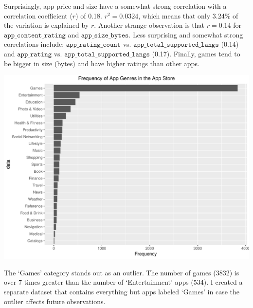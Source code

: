 \documentclass[]{article}
\newenvironment{Shaded}{\begin{snugshade}}{\end{snugshade}}
\newcommand{\KeywordTok}[1]{\textcolor[rgb]{0.13,0.29,0.53}{\textbf{#1}}}
\newcommand{\DataTypeTok}[1]{\textcolor[rgb]{0.13,0.29,0.53}{#1}}
\newcommand{\StringTok}[1]{\textcolor[rgb]{0.31,0.60,0.02}{#1}}
\newcommand{\OperatorTok}[1]{\textcolor[rgb]{0.81,0.36,0.00}{\textbf{#1}}}
\newcommand{\NormalTok}[1]{#1}
\begin{document}
Surprisingly, app price and size have a somewhat strong correlation with
a correlation coefficient (\(r\)) of 0.18. \(r^2=0.0324\), which means
that only 3.24\% of the variation is explained by \(r\). Another strange
observation is that \(r=0.14\) for \(\texttt{app\_content\_rating}\) and
\(\texttt{app\_size\_bytes}\). Less surprising and somewhat strong
correlations include: \(\texttt{app\_rating\_count}\) vs.
\(\texttt{app\_total\_supported\_langs}\) (0.14) and
\(\texttt{app\_rating}\) vs. \(\texttt{app\_total\_supported\_langs}\)
(0.17). Finally, games tend to be bigger in size (bytes) and have higher
ratings than other apps.

\newpage

\begin{Shaded}
\end{Shaded}

\begin{center}\includegraphics{Plots/analysis3-1} \end{center}

The `Games' category stands out as an outlier. The number of games
(3832) is over 7 times greater than the number of `Entertainment' apps
(534). I created a separate dataset that contains everything but apps
labeled `Games' in case the outlier affects future observations.
\end{document}
